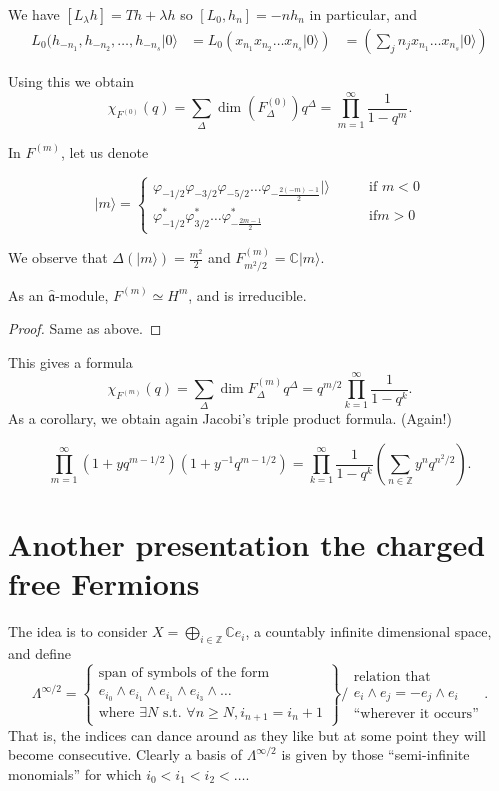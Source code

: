 We have $[L_\lambda h]=Th+\lambda h$
so $[L_0,h_n]=-nh_n$ in particular,
and
$$
\begin{aligned}
L_0(h_{-n_1},h_{-n_2},\ldots,h_{-n_s}
|0\rangle&=
L_0(x_{n_1}x_{n_2}\ldots x_{n_s}|0\rangle)
&=\left(\sum_{j}n_j x_{n_1}\ldots
x_{n_s}|0\rangle\right)
\end{aligned}
$$

\noindent
Using this we obtain
 $$
\chi_{F^{(0)}}(q)=\sum_{\Delta}\dim(F^{(0)}
_{\Delta})q^{\Delta}
=\prod_{m=1}^{\infty}\frac{1}{1-q^m}.
$$

In $F^{(m)}$, let us denote

$$
|m\rangle=\begin{cases}
\varphi_{-1/2}\varphi_{-3/2}\varphi_{-5/2}
\ldots
\varphi_{-\frac{2(-m)-1}{2}}|\rangle\qquad
&\text{if }m<0 \\
\varphi^*_{-1/2}\varphi^*_{3/2}\ldots
\varphi^*_{-\frac{2m-1}{2}}\qquad &\text{if
}m>0
\end{cases}
$$

We observe that
$\Delta(|m\rangle)=\frac{m^2}{2}$
and $F^{(m)}_{m^2/2}=\mathbb{C} |m\rangle$.

\begin{proposition}
\label{proposition-isomo-repre-all-m}
As an $\hat{\mathfrak{a}}$-module,
$F^{(m)}\simeq H^m$, and is irreducible.
\end{proposition}

\begin{proof}
Same as above.
\end{proof}

This gives a formula
$$
\chi_{F^{(m)}}(q)=\sum_{\Delta}\dim
F^{(m)}_\Delta q^\Delta
=q^{m/2}\prod_{k=1}^\infty \frac{1}{1-q^k}.
$$
As a corollary, we obtain again
Jacobi's triple product formula. (Again!)

$$
\prod_{m=1}^\infty(1+yq^{m-1/2})(1+y^{-1}
q^{m-1/2})
=\prod_{k=1}^\infty\frac{1}{1-q^k}
\left(\sum_{n \in
\mathbb{Z}}y^nq^{n^2/2}\right).
$$

\section{Another presentation the charged
free Fermions}
\label{section-anoth-prese-fermi}

The idea is to consider $X = \bigoplus_{i \in
\mathbb{Z}} \mathbb{C} e_i$,
a countably infinite dimensional space,
and define
\begin{equation}
\label{equation-semi-inifinite}
\Lambda^{\infty/2}=
\left\{\substack{\text{span of symbols of the
form} \\
e_{i_0}\wedge e_{i_1}\wedge e_{i_1} \wedge
e_{i_3}\wedge\ldots\\
\text{where }\exists N\text{ s.t. }\forall n
\geq  N,
i_{n+1}=i_n+1}\right\}\Big/
\substack{\text{relation that} \\ e_i\wedge
e_j=- e_j \wedge e_i\\
\text{``wherever it occurs''}}.
\end{equation}
That is, the indices can dance around as they
like
but at some point they will become
consecutive.
Clearly a basis of $\Lambda^{\infty/2}$ is
given
by those ``semi-infinite monomials''
for which
$i_0 < i_1< i_2<\ldots$.

